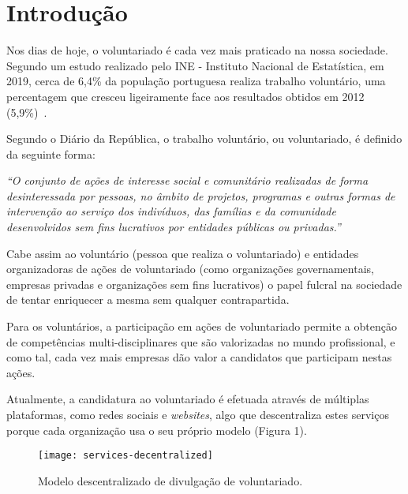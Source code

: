 \section{Introdução} 
Nos dias de hoje, o voluntariado é cada vez mais praticado na nossa sociedade. Segundo um estudo realizado pelo INE - Instituto Nacional de Estatística, em 2019, cerca de 6,4\% da população portuguesa realiza trabalho voluntário, uma percentagem que cresceu ligeiramente face aos resultados obtidos em 2012 (5,9\%)~\cite{INE2019}.

\par \medskip

Segundo o Diário da República, o trabalho voluntário, ou voluntariado, é definido da seguinte forma:

 \par \medskip

\textit{
	``O conjunto de ações de interesse social e comunitário realizadas de forma desinteressada por pessoas, no âmbito de projetos, programas e outras formas de intervenção ao serviço dos indivíduos, das famílias e da comunidade desenvolvidos sem fins lucrativos por entidades públicas ou privadas.''
}~\cite{Republica1998}

\par\medskip

Cabe assim ao voluntário (pessoa que realiza o voluntariado) e entidades organizadoras de ações de voluntariado (como organizações governamentais, empresas privadas e organizações sem fins lucrativos) o papel fulcral na sociedade de tentar enriquecer a mesma sem qualquer contrapartida. 

\par \medskip

Para os voluntários, a participação em ações de voluntariado permite a obtenção de competências multi-disciplinares que são valorizadas no mundo profissional, e como tal, cada vez mais empresas dão valor a candidatos que participam nestas ações. 

\par \medskip

Atualmente, a candidatura ao voluntariado é efetuada através de múltiplas plataformas, como redes sociais e \textit{websites}, algo que descentraliza estes serviços porque cada organização usa o seu próprio modelo (Figura 1).

\begin{figure}[h]
	\centering
	\texttt{[image: services-decentralized]}
	\caption{Modelo descentralizado de divulgação de voluntariado.}	
\end{figure}

